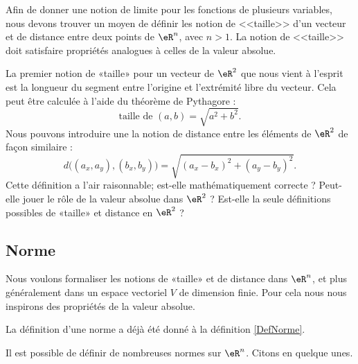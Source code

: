 Afin de donner une notion de limite pour les fonctions de plusieurs variables, nous devons trouver un moyen de définir les notion de <<taille>> d'un vecteur et de distance entre deux points de $\eR^n$, avec $n>1$. La notion de <<taille>> doit satisfaire propriétés analogues à celles de la valeur absolue. 

La premier notion de «taille» pour un vecteur de $\eR^2$ que nous vient à l'esprit est la longueur du segment entre l'origine et l'extrémité libre du vecteur. Cela peut être calculée à l'aide du théorème de Pythagore : 
\begin{equation}
  \textrm{taille de } (a,b) = \sqrt{a^2+b^2}.
\end{equation}
Nous pouvons introduire une la notion de distance entre les éléments de $\eR^2$ de façon similaire :
\begin{equation}
	d\big((a_x,a_y),(b_x,b_y)\big)=\sqrt{  (a_x-b_x)^2+(a_y-b_y)^2  }.
\end{equation}
Cette définition a l'air raisonnable; est-elle mathématiquement correcte ? Peut-elle jouer le rôle de la valeur absolue dans $\eR^2$ ? Est-elle la seule définitions possibles de «taille» et distance en $\eR^2$ ?  

\subsection{Norme}

Nous voulons formaliser les notions de «taille» et de distance dans $\eR^n$, et plus généralement dans un espace vectoriel $V$ de dimension finie. Pour cela nous nous inspirons des propriétés de la valeur absolue.

La définition d'une norme a déjà été donné à la définition \ref{DefNorme}.


Il est possible de définir de nombreuses normes sur $\eR^n$. Citons en quelque unes. 

